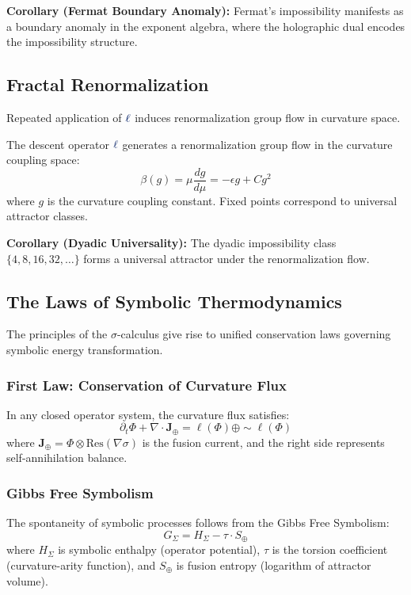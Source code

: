 \textbf{Corollary (Fermat Boundary Anomaly):} Fermat's impossibility manifests as a boundary anomaly in the exponent algebra, where the holographic dual encodes the impossibility structure.

\subsection{Fractal Renormalization}
Repeated application of $\lha$ induces renormalization group flow in curvature space.

\begin{theorem}
The descent operator $\lha$ generates a renormalization group flow in the curvature coupling space:
\[ \beta(g) = \mu \frac{d g}{d \mu} = - \epsilon g + C g^2 \]
where $g$ is the curvature coupling constant. Fixed points correspond to universal attractor classes.
\end{theorem}

\textbf{Corollary (Dyadic Universality):} The dyadic impossibility class $\{4, 8, 16, 32, \ldots\}$ forms a universal attractor under the renormalization flow.

\subsection{The Laws of Symbolic Thermodynamics}
The principles of the $\sigma$-calculus give rise to unified conservation laws governing symbolic energy transformation.

\subsubsection{First Law: Conservation of Curvature Flux}
\begin{theorem}
In any closed operator system, the curvature flux satisfies:
\[
\partial_t \Phi + \nabla \cdot \mathbf{J}_{\oplus} = \ell(\Phi) \oplus \sim\ell(\Phi)
\]
where $\mathbf{J}_{\oplus} = \Phi \otimes \text{Res}(\nabla \sigma)$ is the fusion current, and the right side represents self-annihilation balance.
\end{theorem}

\subsubsection{Gibbs Free Symbolism}
The spontaneity of symbolic processes follows from the Gibbs Free Symbolism:
\[ G_\Sigma = H_\Sigma - \tau \cdot S_\oplus \]
where $H_\Sigma$ is symbolic enthalpy (operator potential), $\tau$ is the torsion coefficient (curvature-arity function), and $S_\oplus$ is fusion entropy (logarithm of attractor volume).

